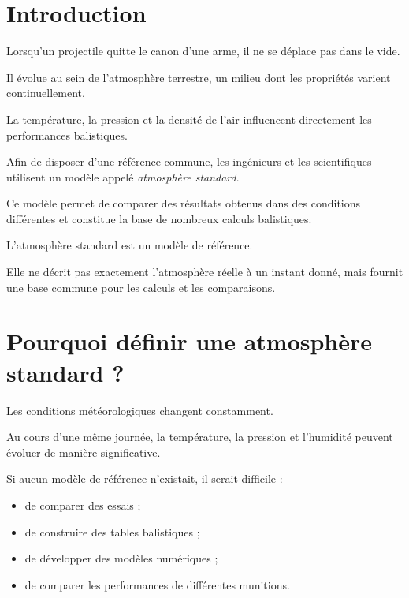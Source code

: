 
\section{Introduction}

Lorsqu'un projectile quitte le canon d'une arme, il ne se déplace pas dans le
vide.

Il évolue au sein de l'atmosphère terrestre, un milieu dont les propriétés
varient continuellement.

La température, la pression et la densité de l'air influencent directement
les performances balistiques.

Afin de disposer d'une référence commune, les ingénieurs et les scientifiques
utilisent un modèle appelé \emph{atmosphère standard}.

Ce modèle permet de comparer des résultats obtenus dans des conditions
différentes et constitue la base de nombreux calculs balistiques.

\begin{aretenir}

L'atmosphère standard est un modèle de référence.

Elle ne décrit pas exactement l'atmosphère réelle à un instant donné, mais
fournit une base commune pour les calculs et les comparaisons.

\end{aretenir}

\section{Pourquoi définir une atmosphère standard ?}

Les conditions météorologiques changent constamment.

Au cours d'une même journée, la température, la pression et l'humidité peuvent
évoluer de manière significative.

Si aucun modèle de référence n'existait, il serait difficile :

\begin{itemize}
\item de comparer des essais ;
\item de construire des tables balistiques ;
\item de développer des modèles numériques ;
\item de comparer les performances de différentes munitions.
\end{itemize}


